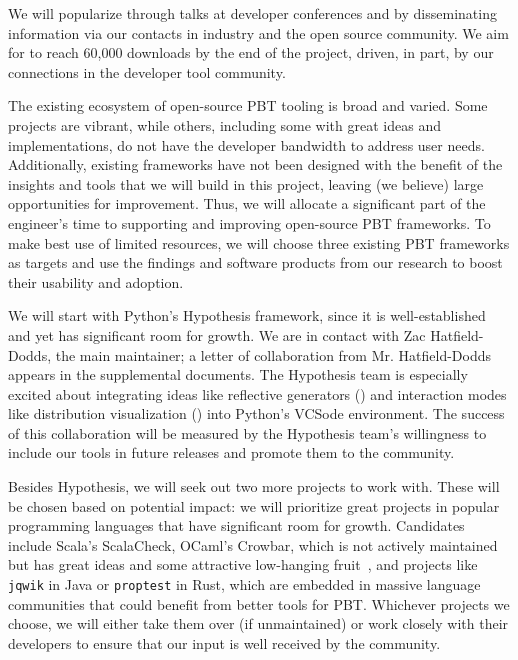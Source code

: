 We will popularize \tyche{} through talks at developer
conferences and by
disseminating information via our contacts in industry and the open source
community. We aim for \tyche{} to reach 60,000 downloads by the end of the
project, driven, in part, by our connections in the developer tool community.

The existing ecosystem of open-source PBT tooling is broad and varied. Some
projects are vibrant, while others, including some with
great ideas and implementations, do not have the developer bandwidth to address
user needs. Additionally, existing frameworks have not been designed with
the benefit of the insights and tools that we will build in this
project, leaving (we believe) large opportunities for improvement.
Thus, we will allocate a significant part of the engineer's time to
supporting and improving open-source PBT frameworks.
%
To make best use of limited resources, we will choose three existing PBT
frameworks as targets and use the findings and software products from
our research to boost their usability and adoption.

We will start
with Python's Hypothesis framework, since it is well-established and yet has
significant room for growth.  We are in contact with Zac Hatfield-Dodds, the
main maintainer; a letter of collaboration from Mr.{}
Hatfield-Dodds appears in the supplemental documents. The Hypothesis team is
especially excited about integrating ideas like reflective generators
() and interaction modes like distribution
visualization () into Python's VCSode environment.
The success of this collaboration will be measured by the Hypothesis team's
willingness to include our tools in future releases and promote them to the
community.

Besides Hypothesis, we will seek out two more projects to work with. These
will be chosen based on potential impact: we will prioritize great
projects in popular programming languages that have significant room
for growth. Candidates include
Scala's ScalaCheck,
OCaml's Crowbar, which is not actively maintained but has great ideas and
some attractive low-hanging fruit~\cite{noauthor_shrinking_nodate}, and projects like
\lstinline{jqwik} in Java or \lstinline{proptest} in Rust, which are
embedded in massive language
communities that could benefit from better tools for PBT. Whichever
projects we choose, we will either take them over (if
unmaintained) or work closely with their
developers to ensure that our input is well received by the community.

